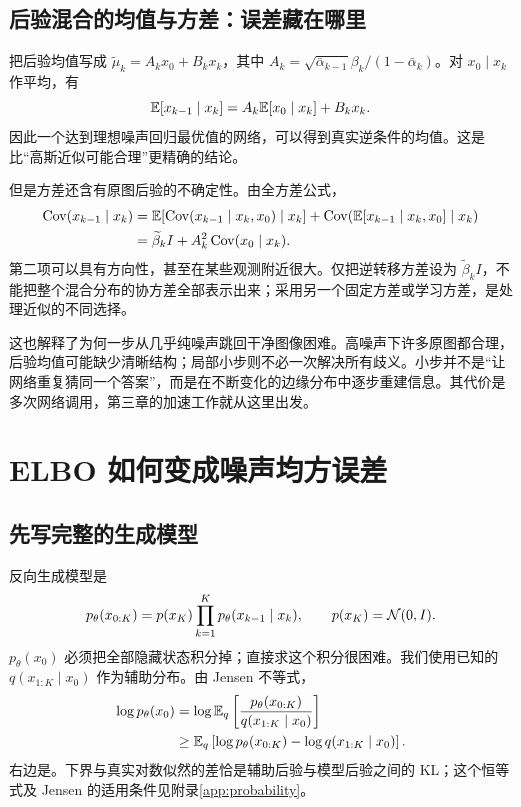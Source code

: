 \subsection{后验混合的均值与方差：误差藏在哪里}
把后验均值写成 $\widetilde\mu_k=A_kx_0+B_kx_k$，其中 $A_k=\sqrt{\bar\alpha_{k-1}}\beta_k/(1-\bar\alpha_k)$。对 $x_0\mid x_k$ 作平均，有
\begin{equation}
 \mathbb{E}[x_{k-1}\mid x_k]=A_k\mathbb{E}[x_0\mid x_k]+B_kx_k.
\end{equation}
因此一个达到理想噪声回归最优值的网络，可以得到真实逆条件的均值。这是比“高斯近似可能合理”更精确的结论。

但是方差还含有原图后验的不确定性。由全方差公式，
\begin{align}
 \operatorname{Cov}(x_{k-1}\mid x_k)
 &=\mathbb{E}[\operatorname{Cov}(x_{k-1}\mid x_k,x_0)\mid x_k]
 +\operatorname{Cov}(\mathbb{E}[x_{k-1}\mid x_k,x_0]\mid x_k)\\
 &=\widetilde\beta_k I+A_k^2\operatorname{Cov}(x_0\mid x_k).
\end{align}
第二项可以具有方向性，甚至在某些观测附近很大。仅把逆转移方差设为 $\widetilde\beta_kI$，不能把整个混合分布的协方差全部表示出来；采用另一个固定方差或学习方差，是处理近似的不同选择。

这也解释了为何一步从几乎纯噪声跳回干净图像困难。高噪声下许多原图都合理，后验均值可能缺少清晰结构；局部小步则不必一次解决所有歧义。小步并不是“让网络重复猜同一个答案”，而是在不断变化的边缘分布中逐步重建信息。其代价是多次网络调用，第三章的加速工作就从这里出发。

\section{ELBO 如何变成噪声均方误差}\label{sec:ddpm-elbo}
\subsection{先写完整的生成模型}
反向生成模型是
\begin{equation}
 p_\theta(x_{0:K})=p(x_K)\prod_{k=1}^Kp_\theta(x_{k-1}\mid x_k),\qquad
 p(x_K)=\mathcal{N}(0,I).
\end{equation}
$p_\theta(x_0)$ 必须把全部隐藏状态积分掉；直接求这个积分很困难。我们使用已知的 $q(x_{1:K}\mid x_0)$ 作为辅助分布。由 Jensen 不等式，
\begin{align}
 \log p_\theta(x_0)
 &=\log\mathbb{E}_q\left[\frac{p_\theta(x_{0:K})}{q(x_{1:K}\mid x_0)}\right]\\
 &\ge\mathbb{E}_q\left[\log p_\theta(x_{0:K})-\log q(x_{1:K}\mid x_0)\right].
\end{align}
右边是。下界与真实对数似然的差恰是辅助后验与模型后验之间的 KL；这个恒等式及 Jensen 的适用条件见附录\ref{app:probability}。


